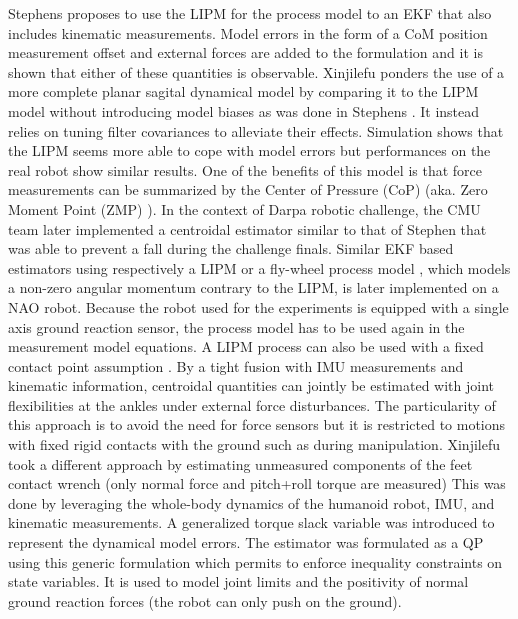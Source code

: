 Stephens \cite{stephens2011state} proposes to use the LIPM for the process model to an EKF 
that also includes kinematic measurements. Model errors in the form of a CoM position measurement 
offset and external forces are added to the formulation and it is shown that either of these quantities is observable. 
Xinjilefu \cite{xinjilefu2012state} ponders the use of a more complete planar sagital dynamical model by comparing it to the LIPM model
without introducing model biases as was done in Stephens \cite{stephens2011state}. It instead relies on tuning filter covariances to alleviate their effects. 
Simulation shows that the LIPM seems more able to cope with model errors but performances on the real robot show similar results. 
One of the benefits of this model is that force measurements can be summarized by the Center of Pressure (CoP) (aka. Zero Moment Point (ZMP) \cite{sardain2004forces}).
In the context of Darpa robotic challenge, the CMU team later implemented a centroidal estimator \cite{xinjilefu2015center} similar to that of Stephen \cite{stephens2011state} that was able to prevent a fall during the challenge finals. 
Similar EKF based estimators using respectively a LIPM \cite{piperakis2016non} or a fly-wheel process model \cite{piperakis2018nonlinear}, which models a non-zero angular momentum contrary to the LIPM,  is later implemented on a NAO robot. 
Because the robot used for the experiments is equipped with a single axis ground reaction sensor,
the process model has to be used again in the measurement model equations.   
A LIPM process can also be used with a fixed contact point assumption \cite{benallegue2015estimation}. By a tight fusion with IMU 
measurements and kinematic information, centroidal quantities can jointly be estimated with joint flexibilities at the ankles under external force disturbances. 
The particularity of this approach is to avoid the need for force sensors but it is restricted to motions with fixed rigid contacts with the ground 
such as during manipulation.
Xinjilefu \cite{xinjilefu2014dynamic} took a different approach by estimating unmeasured components of the feet contact wrench (only normal force and pitch+roll torque are measured)
This was done by leveraging the whole-body dynamics of the humanoid robot, IMU, and kinematic measurements. 
A generalized torque slack variable was introduced to represent the dynamical model errors. %
The estimator was formulated as a QP using this generic formulation which permits to enforce inequality constraints on state variables. 
It is used to model joint limits and the positivity of normal ground reaction forces (the robot can only push on the ground).


